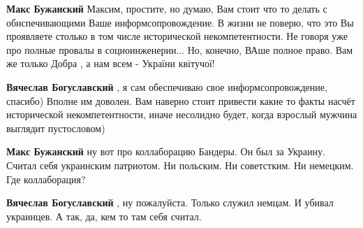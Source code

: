 \begin{itemize}
\begin{itemize}
 
\textbf{Макс Бужанский} Максим, простите, но думаю, Вам стоит что то делать с обнспечивающими Ваше информсопровождение. \Smiley[1.0][yellow] В жизни не поверю, что это Вы проявляете столько в том числе исторической некомпетентности. Не говоря уже про полные провалы в социоинженерии... \Smiley[1.0][yellow] Но, конечно, ВАше полное право. Вам же только Добра , а нам всем - України квітучої! \Smiley[1.0][yellow]

 
\textbf{Вячеслав Богуславский} , я сам обеспечиваю свое информсопровождение, спасибо)
Вполне им доволен.
Вам наверно стоит привести какие то факты насчёт исторической некомпетентности, иначе несолидно будет, когда взрослый мужчина выглядит пустословом)

 
\textbf{Макс Бужанский} ну вот про коллаборацию Бандеры. Он был за Украину. Считал себя украинским патриотом. Ни польским. Ни советстким. Ни немецким. Где коллаборация?

 
\textbf{Вячеслав Богуславский} , ну пожалуйста.
Только служил немцам.
И убивал украинцев. А так, да, кем то там себя считал.

 

\end{itemize}
\end{itemize}
